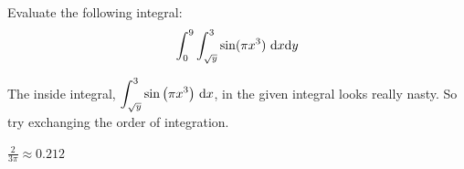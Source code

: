 \begin{question}[M200 2001D] %
Evaluate the following integral:
\begin{equation*}
\int_0^9\int_{\sqrt{y}}^3\sin(\pi x^3)\ \dee{x}\dee{y}
\end{equation*}
\end{question}

\begin{hint}
The inside integral, $\dst\int_{\sqrt{y}}^3\sin\big(\pi x^3\big)\ \dee{x}$,
in the given integral looks really nasty.  So try exchanging
the order of integration.
\end{hint}

\begin{answer}
$\frac{2}{3\pi}\approx 0.212$
\end{answer}

